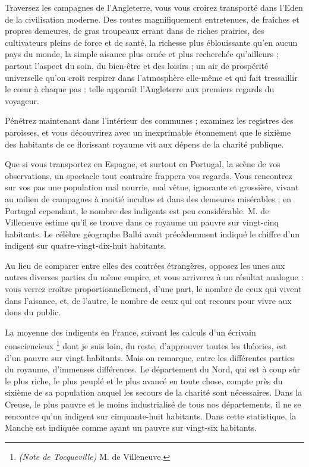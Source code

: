 \documentclass[french,twoside]{book} %
\begin{document}
\noindent Traversez les campagnes de l’Angleterre, vous vous croirez transporté dans l’Eden de la civilisation moderne. Des routes magnifiquement entretenues, de fraîches et propres demeures, de gras troupeaux errant dans de riches prairies, des cultivateurs pleins de force et de santé, la richesse plus éblouissante qu’en aucun pays du monde, la simple aisance plus ornée et plus recherchée qu’ailleurs ; partout l’aspect du soin, du bien-être et des loisirs ; un air de prospérité universelle qu’on croit respirer dans l’atmosphère elle-même et qui fait tressaillir le cœur à chaque pas : telle apparaît l’Angleterre aux premiers regards du voyageur.\par
Pénétrez maintenant dans l’intérieur des communes ; examinez les registres des paroisses, et vous découvrirez avec un inexprimable étonnement que le sixième des habitants de ce florissant royaume vit aux dépens de la charité publique.\par
Que si vous transportez en Espagne, et surtout en Portugal, la scène de vos observations, un spectacle tout contraire frappera vos regards. Vous rencontrez sur vos pas une population mal nourrie, mal vêtue, ignorante et grossière, vivant au milieu de campagnes à moitié incultes et dans des demeures misérables ; en Portugal cependant, le nombre des indigents est peu considérable. M. de Villeneuve estime qu’il se trouve dans ce royaume un pauvre sur vingt-cinq habitants. Le célèbre géographe Balbi avait précédemment indiqué le chiffre d’un indigent sur quatre-vingt-dix-huit habitants.\par
\bigbreak
\noindent Au lieu de comparer entre elles des contrées étrangères, opposez les unes aux autres diverses parties du même empire, et vous arriverez à un résultat analogue : vous verrez croître proportionnellement, d’une part, le nombre de ceux qui vivent dans l’aisance, et, de l’autre, le nombre de ceux qui ont recours pour vivre aux dons du public.\par
La moyenne des indigents en France, suivant les calculs d’un écrivain consciencieux \footnote{\emph{(Note de Tocqueville)} M. de Villeneuve.} dont je suis loin, du reste, d’approuver toutes les théories, est d’un pauvre sur vingt habitants. Mais on remarque, entre les différentes parties du royaume, d’immenses différences. Le département du Nord, qui est à coup sûr le plus riche, le plus peuplé et le plus avancé en toute chose, compte près du sixième de sa population auquel les secours de la charité sont nécessaires. Dans la Creuse, le plus pauvre et le moins industrialisé de tous nos départements, il ne se rencontre qu’un indigent sur cinquante-huit habitants. Dans cette statistique, la Manche est indiquée comme ayant un pauvre sur vingt-six habitants.\par
\end{document}
